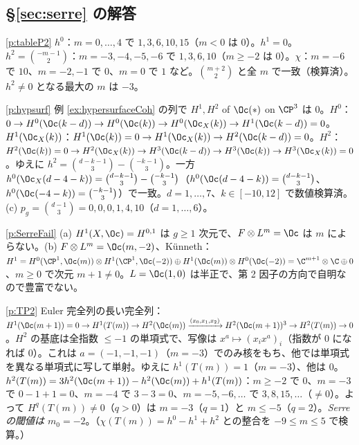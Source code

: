\subsection*{\S\ref{sec:serre} の解答}
\begin{sol}{\ref{p:tableP2}}
$h^0$：$m=0,\dots,4$ で $1,3,6,10,15$（$m<0$ は $0$）。$h^1=0$。$h^2=\binom{-m-1}2$：$m=-3,-4,-5,-6$ で $1,3,6,10$（$m\ge-2$ は $0$）。$\chi$：$m=-6$ で $10$、$m=-2,-1$ で $0$、$m=0$ で $1$ など。$\binom{m+2}2$ と全 $m$ で一致（検算済）。$h^2\ne0$ となる最大の $m$ は $-3$。
\end{sol}
\begin{sol}{\ref{p:hypsurf}}
例 \ref{ex:hypersurfaceCoh} の列で $H^1,H^2$ of $\Oc(\ast)$ on $\CP^3$ は $0$。$H^0$：$0\to H^0(\Oc(k-d))\to H^0(\Oc(k))\to H^0(\Oc_X(k))\to H^1(\Oc(k-d))=0$。$H^1(\Oc_X(k))$：$H^1(\Oc(k))=0\to H^1(\Oc_X(k))\to H^2(\Oc(k-d))=0$。$H^2$：$H^2(\Oc(k))=0\to H^2(\Oc_X(k))\to H^3(\Oc(k-d))\to H^3(\Oc(k))\to H^3(\Oc_X(k))=0$。ゆえに $h^2=\binom{d-k-1}3-\binom{-k-1}3$。一方 $h^0(\Oc_X(d-4-k))=\binom{d-k-1}3-\binom{-k-1}3$（$h^0(\Oc(d-4-k))=\binom{d-k-1}3$、$h^0(\Oc(-4-k))=\binom{-k-1}3$）で一致。$d=1,\dots,7$、$k\in[-10,12]$ で数値検算済。(c) $p_g=\binom{d-1}3=0,0,0,1,4,10$（$d=1,\ldots,6$）。
\end{sol}
\begin{sol}{\ref{p:SerreFail}}
(a) $H^1(X,\Oc)=H^{0,1}$ は $g\ge1$ 次元で、$F\otimes L^m=\Oc$ は $m$ によらない。(b) $F\otimes L^m=\Oc(m,-2)$、Künneth：$H^1=H^0(\CP^1,\Oc(m))\otimes H^1(\CP^1,\Oc(-2))\oplus H^1(\Oc(m))\otimes H^0(\Oc(-2))=\C^{m+1}\otimes\C\oplus0$、$m\ge0$ で次元 $m+1\ne0$。$L=\Oc(1,0)$ は半正で、第 2 因子の方向で自明なので豊富でない。
\end{sol}
\begin{sol}{\ref{p:TP2}}
Euler 完全列の長い完全列：$H^1(\Oc(m+1))=0\to H^1(T(m))\to H^2(\Oc(m))\xrightarrow{(x_0,x_1,x_2)}H^2(\Oc(m+1))^3\to H^2(T(m))\to0$。$H^2$ の基底は全指数 $\le-1$ の単項式で、写像は $x^a\mapsto(x_ix^a)_i$（指数が $0$ になれば $0$）。これは $a=(-1,-1,-1)$（$m=-3$）でのみ核をもち、他では単項式を異なる単項式に写して単射。ゆえに $h^1(T(m))=1$（$m=-3$）、他は $0$。$h^2(T(m))=3h^2(\Oc(m+1))-h^2(\Oc(m))+h^1(T(m))$：$m\ge-2$ で $0$、$m=-3$ で $0-1+1=0$、$m=-4$ で $3-3=0$、$m=-5,-6,\dots$ で $3,8,15,\dots$（$\ne0$）。よって $H^q(T(m))\ne0$（$q>0$）は $m=-3$（$q=1$）と $m\le-5$（$q=2$）。\emph{Serre の閾値は $m_0=-2$}。（$\chi(T(m))=h^0-h^1+h^2$ との整合を $-9\le m\le5$ で検算。）
\end{sol}

